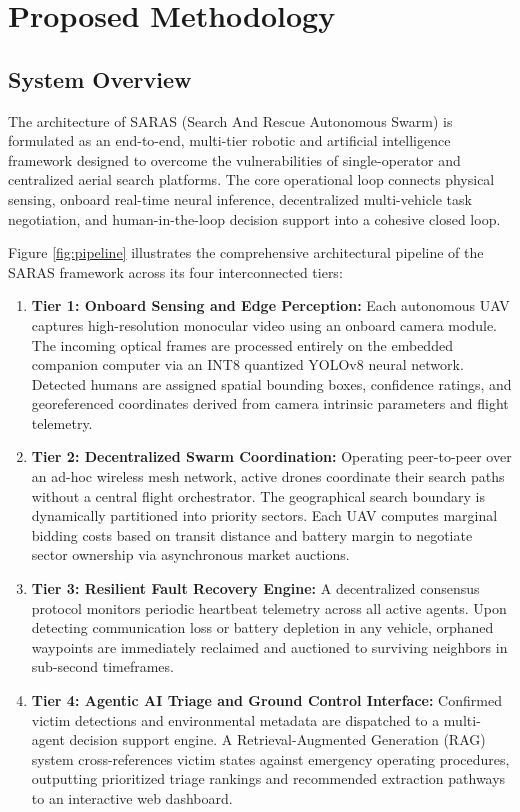 \chapter{Proposed Methodology}

\section{System Overview}

The architecture of SARAS (Search And Rescue Autonomous Swarm) is formulated as an end-to-end, multi-tier robotic and artificial intelligence framework designed to overcome the vulnerabilities of single-operator and centralized aerial search platforms. The core operational loop connects physical sensing, onboard real-time neural inference, decentralized multi-vehicle task negotiation, and human-in-the-loop decision support into a cohesive closed loop.

Figure \ref{fig:pipeline} illustrates the comprehensive architectural pipeline of the SARAS framework across its four interconnected tiers:
\begin{enumerate}
    \item \textbf{Tier 1: Onboard Sensing and Edge Perception:} Each autonomous UAV captures high-resolution monocular video using an onboard camera module. The incoming optical frames are processed entirely on the embedded companion computer via an INT8 quantized YOLOv8 neural network. Detected humans are assigned spatial bounding boxes, confidence ratings, and georeferenced coordinates derived from camera intrinsic parameters and flight telemetry.
    \item \textbf{Tier 2: Decentralized Swarm Coordination:} Operating peer-to-peer over an ad-hoc wireless mesh network, active drones coordinate their search paths without a central flight orchestrator. The geographical search boundary is dynamically partitioned into priority sectors. Each UAV computes marginal bidding costs based on transit distance and battery margin to negotiate sector ownership via asynchronous market auctions.
    \item \textbf{Tier 3: Resilient Fault Recovery Engine:} A decentralized consensus protocol monitors periodic heartbeat telemetry across all active agents. Upon detecting communication loss or battery depletion in any vehicle, orphaned waypoints are immediately reclaimed and auctioned to surviving neighbors in sub-second timeframes.
    \item \textbf{Tier 4: Agentic AI Triage and Ground Control Interface:} Confirmed victim detections and environmental metadata are dispatched to a multi-agent decision support engine. A Retrieval-Augmented Generation (RAG) system cross-references victim states against emergency operating procedures, outputting prioritized triage rankings and recommended extraction pathways to an interactive web dashboard.
\end{enumerate}

